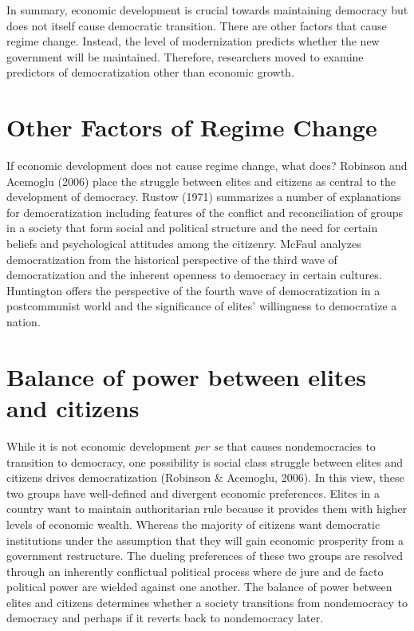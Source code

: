 \documentclass[12pt,]{article}
\begin{document}
In summary, economic development is crucial towards maintaining
democracy but does not itself cause democratic transition. There are
other factors that cause regime change. Instead, the level of
modernization predicts whether the new government will be maintained.
Therefore, researchers moved to examine predictors of democratization
other than economic growth.

\hypertarget{other-factors-of-regime-change}{%
\section{Other Factors of Regime
Change}\label{other-factors-of-regime-change}}

If economic development does not cause regime change, what does?
Robinson and Acemoglu (2006) place the struggle between elites and
citizens as central to the development of democracy. Rustow (1971)
summarizes a number of explanations for democratization including
features of the conflict and reconciliation of groups in a society that
form social and political structure and the need for certain beliefs and
psychological attitudes among the citizenry. McFaul analyzes
democratization from the historical perspective of the third wave of
democratization and the inherent openness to democracy in certain
cultures. Huntington offers the perspective of the fourth wave of
democratization in a postcommunist world and the significance of elites'
willingness to democratize a nation.

\hypertarget{balance-of-power-between-elites-and-citizens}{%
\section{Balance of power between elites and
citizens}\label{balance-of-power-between-elites-and-citizens}}

While it is not economic development \emph{per se} that causes
nondemocracies to transition to democracy, one possibility is social
class struggle between elites and citizens drives democratization
(Robinson \& Acemoglu, 2006). In this view, these two groups have
well-defined and divergent economic preferences. Elites in a country
want to maintain authoritarian rule because it provides them with higher
levels of economic wealth. Whereas the majority of citizens want
democratic institutions under the assumption that they will gain
economic prosperity from a government restructure. The dueling
preferences of these two groups are resolved through an inherently
conflictual political process where de jure and de facto political power
are wielded against one another. The balance of power between elites and
citizens determines whether a society transitions from nondemocracy to
democracy and perhaps if it reverts back to nondemocracy later.
\end{document}
